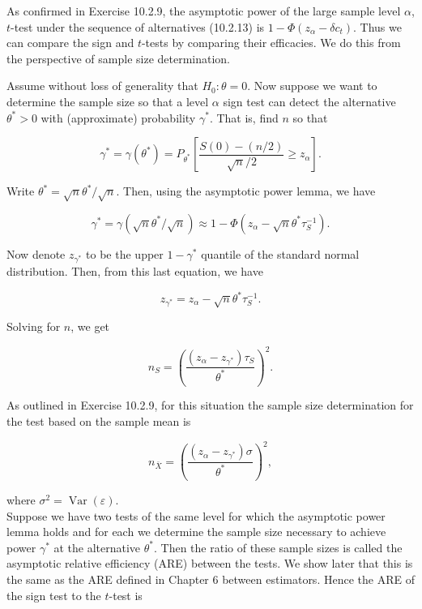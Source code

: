 As confirmed in Exercise 10.2.9, the asymptotic power of the large sample level $\alpha$, $t$-test under the sequence of alternatives (10.2.13) is $1-\Phi\left(z_{\alpha}-\delta c_{t}\right)$. Thus we can compare the sign and $t$-tests by comparing their efficacies. We do this from the perspective of sample size determination.

Assume without loss of generality that $H_{0}: \theta=0$. Now suppose we want to determine the sample size so that a level $\alpha$ sign test can detect the alternative $\theta^{*}>0$ with (approximate) probability $\gamma^{*}$. That is, find $n$ so that


\begin{equation*}
\gamma^{*}=\gamma\left(\theta^{*}\right)=P_{\theta^{*}}\left[\frac{S(0)-(n / 2)}{\sqrt{n} / 2} \geq z_{\alpha}\right] . \tag{10.2.24}
\end{equation*}


Write $\theta^{*}=\sqrt{n} \theta^{*} / \sqrt{n}$. Then, using the asymptotic power lemma, we have

$$
\gamma^{*}=\gamma\left(\sqrt{n} \theta^{*} / \sqrt{n}\right) \approx 1-\Phi\left(z_{\alpha}-\sqrt{n} \theta^{*} \tau_{S}^{-1}\right) .
$$

Now denote $z_{\gamma^{*}}$ to be the upper $1-\gamma^{*}$ quantile of the standard normal distribution. Then, from this last equation, we have

$$
z_{\gamma^{*}}=z_{\alpha}-\sqrt{n} \theta^{*} \tau_{S}^{-1} .
$$

Solving for $n$, we get


\begin{equation*}
n_{S}=\left(\frac{\left(z_{\alpha}-z_{\gamma^{*}}\right) \tau_{S}}{\theta^{*}}\right)^{2} . \tag{10.2.25}
\end{equation*}


As outlined in Exercise 10.2.9, for this situation the sample size determination for the test based on the sample mean is


\begin{equation*}
n_{\bar{X}}=\left(\frac{\left(z_{\alpha}-z_{\gamma^{*}}\right) \sigma}{\theta^{*}}\right)^{2}, \tag{10.2.26}
\end{equation*}


where $\sigma^{2}=\operatorname{Var}(\varepsilon)$.\\
Suppose we have two tests of the same level for which the asymptotic power lemma holds and for each we determine the sample size necessary to achieve power $\gamma^{*}$ at the alternative $\theta^{*}$. Then the ratio of these sample sizes is called the asymptotic relative efficiency (ARE) between the tests. We show later that this is the same as the ARE defined in Chapter 6 between estimators. Hence the ARE of the sign test to the $t$-test is


